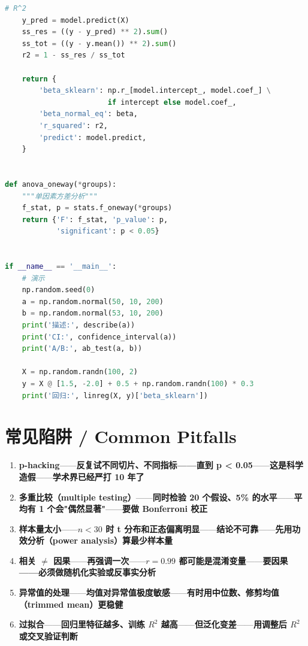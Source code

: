 \begin{lstlisting}[language=Python, caption={statistics.py}]
    # R^2
    y_pred = model.predict(X)
    ss_res = ((y - y_pred) ** 2).sum()
    ss_tot = ((y - y.mean()) ** 2).sum()
    r2 = 1 - ss_res / ss_tot

    return {
        'beta_sklearn': np.r_[model.intercept_, model.coef_] \
                        if intercept else model.coef_,
        'beta_normal_eq': beta,
        'r_squared': r2,
        'predict': model.predict,
    }


def anova_oneway(*groups):
    """单因素方差分析"""
    f_stat, p = stats.f_oneway(*groups)
    return {'F': f_stat, 'p_value': p,
            'significant': p < 0.05}


if __name__ == '__main__':
    # 演示
    np.random.seed(0)
    a = np.random.normal(50, 10, 200)
    b = np.random.normal(53, 10, 200)
    print('描述:', describe(a))
    print('CI:', confidence_interval(a))
    print('A/B:', ab_test(a, b))

    X = np.random.randn(100, 2)
    y = X @ [1.5, -2.0] + 0.5 + np.random.randn(100) * 0.3
    print('回归:', linreg(X, y)['beta_sklearn'])
\end{lstlisting}

\section{常见陷阱 / Common Pitfalls}

\begin{enumerate}
\item \textbf{p-hacking}——\textbf{反复试不同切片、不同指标——直到 p < 0.05}——\textbf{这是科学造假}——\textbf{学术界已经严打 10 年了}
\item \textbf{多重比较（multiple testing）}——\textbf{同时检验 20 个假设、5\% 的水平}——\textbf{平均有 1 个会"偶然显著"}——\textbf{要做 Bonferroni 校正}
\item \textbf{样本量太小}——\textbf{$n < 30$ 时 t 分布和正态偏离明显}——\textbf{结论不可靠}——\textbf{先用功效分析（power analysis）算最少样本量}
\item \textbf{相关 $\neq$ 因果}——\textbf{再强调一次}——\textbf{$r = 0.99$ 都可能是混淆变量}——\textbf{要因果——必须做随机化实验或反事实分析}
\item \textbf{异常值的处理}——\textbf{均值对异常值极度敏感}——\textbf{有时用中位数、修剪均值（trimmed mean）更稳健}
\item \textbf{过拟合}——\textbf{回归里特征越多、训练 $R^2$ 越高}——\textbf{但泛化变差}——\textbf{用调整后 $R^2$ 或交叉验证判断}
\end{enumerate}


